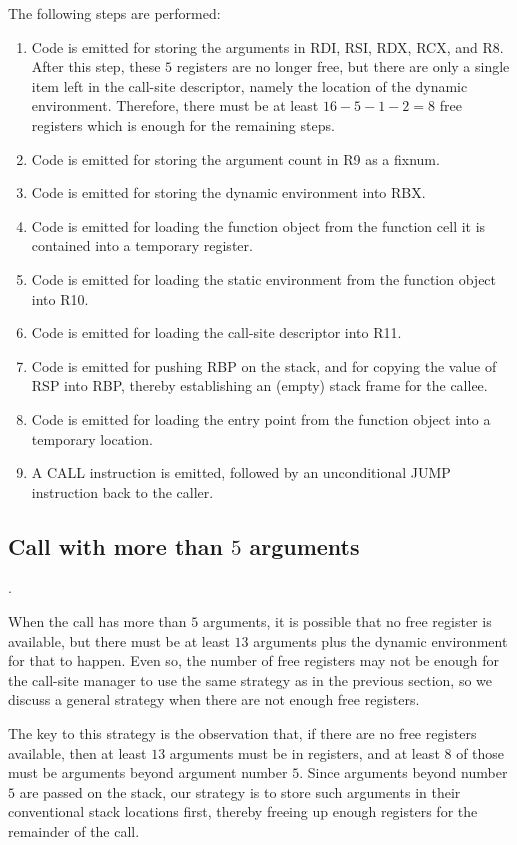 The following steps are performed:

\begin{enumerate}
\item Code is emitted for storing the arguments in RDI, RSI, RDX, RCX,
  and R8.  After this step, these $5$ registers are no longer free,
  but there are only a single item left in the call-site descriptor,
  namely the location of the dynamic environment.  Therefore, there
  must be at least $16 - 5 - 1 - 2 = 8$ free registers which is
  enough for the remaining steps.
\item Code is emitted for storing the argument count in R9 as a fixnum.
\item Code is emitted for storing the dynamic environment into RBX.
\item Code is emitted for loading the function object from the
  function cell it is contained into a temporary register.
\item Code is emitted for loading the static environment from the
  function object into R10.
\item Code is emitted for loading the call-site descriptor into R11.
\item Code is emitted for pushing RBP on the stack, and for copying
  the value of RSP into RBP, thereby establishing an (empty) stack
  frame for the callee.
\item Code is emitted for loading the entry point from the function
  object into a temporary location.
\item A CALL instruction is emitted, followed by an unconditional JUMP
  instruction back to the caller.
\end{enumerate}

\subsection{Call with more than $5$ arguments}.

When the call has more than $5$ arguments, it is possible that no free
register is available, but there must be at least $13$ arguments plus
the dynamic environment for that to happen.  Even so, the number of
free registers may not be enough for the call-site manager to use the
same strategy as in the previous section, so we discuss a general
strategy when there are not enough free registers.

The key to this strategy is the observation that, if there are no
free registers available, then at least $13$ arguments must be in
registers, and at least $8$ of those must be arguments beyond argument
number $5$.  Since arguments beyond number $5$ are passed on the
stack, our strategy is to store such arguments in their conventional
stack locations first, thereby freeing up enough registers for the
remainder of the call.

